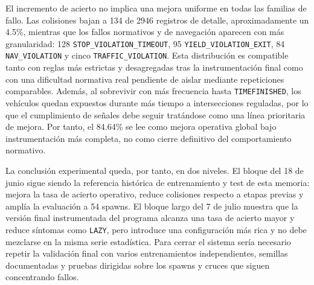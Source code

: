 El incremento de acierto no implica una mejora uniforme en todas las familias de fallo. Las colisiones bajan a 134 de 2946 registros de detalle, aproximadamente un 4.5\%, mientras que los fallos normativos y de navegación aparecen con más granularidad: 128 \texttt{STOP\_VIOLATION\_TIMEOUT}, 95 \texttt{YIELD\_VIOLATION\_EXIT}, 84 \texttt{NAV\_VIOLATION} y cinco \texttt{TRAFFIC\_VIOLATION}. Esta distribución es compatible tanto con reglas más estrictas y desagregadas tras la instrumentación final como con una dificultad normativa real pendiente de aislar mediante repeticiones comparables. Además, al sobrevivir con más frecuencia hasta \texttt{TIMEFINISHED}, los vehículos quedan expuestos durante más tiempo a intersecciones reguladas, por lo que el cumplimiento de señales debe seguir tratándose como una línea prioritaria de mejora. Por tanto, el 84.64\% se lee como mejora operativa global bajo instrumentación más completa, no como cierre definitivo del comportamiento normativo.

La conclusión experimental queda, por tanto, en dos niveles. El bloque del 18 de junio sigue siendo la referencia histórica de entrenamiento y test de esta memoria: mejora la tasa de acierto operativo, reduce colisiones respecto a etapas previas y amplía la evaluación a 54 spawns. El bloque largo del 7 de julio muestra que la versión final instrumentada del programa alcanza una tasa de acierto mayor y reduce síntomas como \texttt{LAZY}, pero introduce una configuración más rica y no debe mezclarse en la misma serie estadística. Para cerrar el sistema sería necesario repetir la validación final con varios entrenamientos independientes, semillas documentadas y pruebas dirigidas sobre los spawns y cruces que siguen concentrando fallos.
